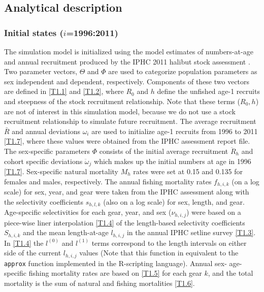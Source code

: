 \subsection{Analytical description} %
\label{sub:analytical_description}

\subsubsection{Initial states ($i$=1996:2011)} %
\label{ssub:initial_states}
The simulation model is initialized using the model estimates of numbers-at-age and annual recruitment produced by the IPHC 2011 halibut stock assessment \citep{Hare2012Rara}.  Two parameter vectors, $\Theta$ and $\Phi$ are used to categorize population parameters as sex independent and dependent, respectively.  Components of these two vectors are defined in \eqref{T1.1} and \eqref{T1.2}, where $R_0$ and $h$ define the unfished age-1 recruits and steepness of the stock recruitment relationship.  Note that these terms ($R_0,h$) are not of interest in this simulation model, because we do not use a stock recruitment relationship to simulate future recruitment.  The average recruitment $\bar{R}$ and annual deviations $\omega_i$ are used to initialize age-1 recruits from 1996 to 2011 \eqref{T1.7}, where these values were obtained from the IPHC assessment report file.  The sex-specific parameters $\Phi$ consists of the initial average recruitment $\ddot{R}_{h}$ and cohort specific deviations $\ddot{\omega}_{j}$ which makes up the initial numbers at age in 1996 \eqref{T1.7}.  Sex-specific natural mortality $M_h$ rates were set at 0.15 and 0.135 for females and males, respectively.  The annual fishing mortality rates $f_{h,i,k}$ (on a log scale) for sex, year, and gear were taken from the IPHC assessment along with the selectivity coefficients $s_{h,l,k}$ (also on a log scale) for sex, length, and gear.  Age-specific selectivities for each gear, year, and sex ($\nu_{h,i,j}$) were based on a piece-wise liner interpolation \eqref{T1.4} of the length-based selectivity coefficients $S_{h,i,k}$ and the mean length-at-age $l_{h,i,j}$ in the annual IPHC setline survey \eqref{T1.3}.  In \eqref{T1.4} the $l^{(0)}$ and $l^{(1)}$ terms correspond to the length intervals on either side of the current $l_{h,i,j}$ values (Note that this function in equivalent to the \texttt{approx} function implemented in the R-scripting  \citep{R-Development-Core-Team:2009fk} language).  Annual sex- age-specific fishing mortality rates are based on \eqref{T1.5} for each gear $k$, and the total mortality is the sum of natural and fishing mortalities \eqref{T1.6}.

